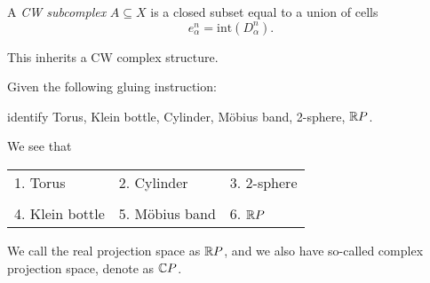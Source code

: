\begin{definition}[CW subcomplex]
	A \emph{CW subcomplex} \(A\subseteq X\) is a closed subset equal to a union of cells
	\[
		e^n_{\alpha} = \mathrm{int}\left(D^n_{\alpha}\right).
	\]
\end{definition}
\begin{remark}
	This inherits a CW complex structure.
\end{remark}

\begin{exercise}
	Given the following gluing instruction:
	\begin{figure}[H]
		\centering
		\label{fig:ex:CW-complex-gluing}
	\end{figure}
	identify Torus, Klein bottle, Cylinder, Möbius band, 2-sphere, \(\mathbb{\MakeUppercase{R}} P\).

	\begin{answer}
		We see that
		\begin{table}[H]
			\centering
			\begin{tabular}{lll}
				1. Torus        & 2. Cylinder    & 3. 2-sphere                                 \\\\
				4. Klein bottle & 5. Möbius band & 6.         \(\mathbb{\MakeUppercase{R}} P\) \\
			\end{tabular}
		\end{table}
	\end{answer}
	\begin{notation}
		We call the real projection space as \(\mathbb{\MakeUppercase{R}} P\), and we also have so-called
		complex projection space, denote as \(\mathbb{\MakeUppercase{C}} P\).
	\end{notation}
\end{exercise}
